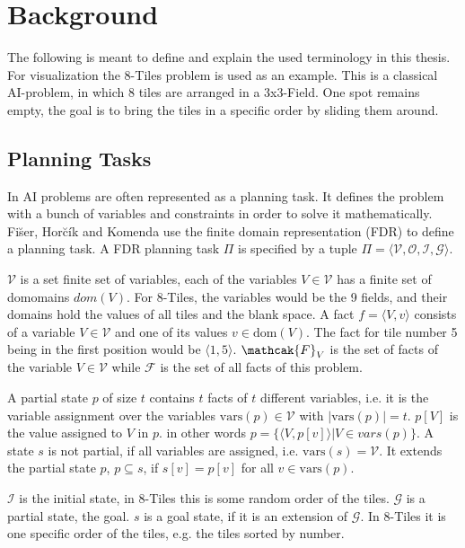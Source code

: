 
\chapter{Background}

The following is meant to define and explain the used terminology in this thesis.
For visualization the 8-Tiles problem is used as an example.
This is a classical AI-problem, in which 8 tiles are arranged in a 3x3-Field.
One spot remains empty, the goal is to bring the tiles in a specific order by sliding them around.

\section {Planning Tasks}
\label{sec:my-label}
In AI problems are often represented as a planning task.
It defines the problem with a bunch of variables and constraints in order to solve it mathematically.
Fi\u{s}er, Hor\u{c}\'{i}k and Komenda use the finite domain representation (FDR) to define a planning task.
A FDR planning task $\Pi$ is specified by a tuple $ \Pi = \langle \mathcal{V}, \mathcal{O}, \mathcal{I}, \mathcal{G} \rangle$.

$\mathcal{V}$ is a set finite set of variables, each of the variables $V\in\mathcal{V}$ has a finite set of domomains $dom(V)$.
For 8-Tiles, the variables would be the 9 fields, and their domains hold the values of all tiles and the blank space.
A fact $f=\langle V, v\rangle$ consists of a variable $V\in\mathcal{V}$ and one of its values $v\in\text{dom}(V)$.
The fact for tile number 5 being in the first position would be $\langle 1,5\rangle$.
$\mathcak{F}_V$ is the set of facts of the variable $V\in\mathcal{V}$ while $\mathcal{F}$ is the set of all facts of this problem.

A partial state $p$ of size $t$ contains $t$ facts of $t$ different variables, i.e. it is the variable assignment over the variables $\text{vars}(p)\in\mathcal{V}$ with $|\text{vars}(p)|=t$.
$p[V]$ is the value assigned to $V$ in $p$.
in other words $p=\{\langle V, p[v] \rangle | V\in vars(p)\}$.
A state $s$ is not partial, if all variables are assigned, i.e. $\text{vars}(s)=\mathcal{V}$.
It extends the partial state $p$, $p\subseteq s$, if $s[v] = p[v]$ for all $v \in\text{vars}(p)$.

$\mathcal{I}$ is the initial state, in 8-Tiles this is some random order of the tiles.
$\mathcal{G}$ is a partial state, the goal. $s$ is a goal state, if it is an extension of $\mathcal{G}$.
In 8-Tiles it is one specific order of the tiles, e.g. the tiles sorted by number.


